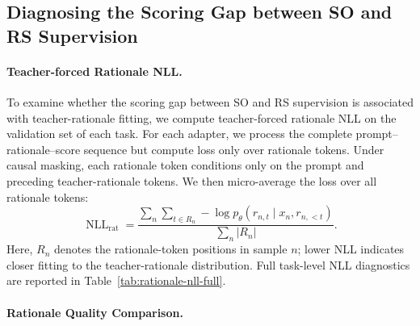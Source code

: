 \subsection{Diagnosing the Scoring Gap between SO and RS Supervision}

%

\paragraph{Teacher-forced Rationale NLL.}

To examine whether the scoring gap between SO and RS supervision is
associated with teacher-rationale fitting, we compute teacher-forced
rationale NLL on the validation set of each task. For each adapter,
we process the complete prompt--rationale--score sequence but compute
loss only over rationale tokens. Under causal masking, each rationale
token conditions only on the prompt and preceding teacher-rationale
tokens. We then micro-average the loss over all rationale tokens:
\[
\operatorname{NLL}_{\mathrm{rat}}
=
\frac{
\sum_n\sum_{t\in R_n}
-\log p_\theta(r_{n,t}\mid x_n,r_{n,<t})
}{
\sum_n |R_n|
}.
\]
Here, \(R_n\) denotes the rationale-token positions in sample \(n\);
lower NLL indicates closer fitting to the teacher-rationale
distribution. Full task-level NLL diagnostics are reported in
Table~\ref{tab:rationale-nll-full}.

\paragraph{Rationale Quality Comparison.}

